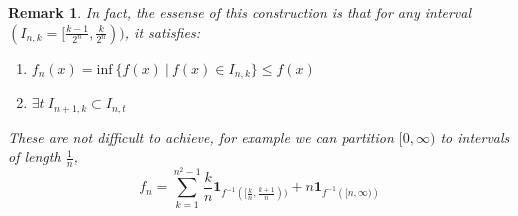 \documentclass[UTF8, 12pt]{article}
\newtheorem*{remark*}{Remark}
\begin{document}
    \begin{remark*}
        In fact, the essense of this construction is that for any interval $(I_{n,k} = [\frac{k-1}{2^n}, \frac{k}{2^n}))$, it satisfies:
        \begin{enumerate}
            \item  
                $
                f_n(x) = \text{inf}\ \{f(x)\ |\ f(x) \in I_{n,k}\} \leq f(x)
                $
            \item $\exists t\ I_{n+1,k} \subset I_{n,t}$
        \end{enumerate}
        These are not difficult to achieve, for example we can partition $[0,\infty)$ to intervals of length $\frac{1}{n}$, 
        $$
            f_n = \sum_{k=1}^{n^2-1} \frac{k}{n}\textbf{1}_{f^{-1}([\frac{k}{n}, \frac{k + 1}{n}))} + n\textbf{1}_{f^{-1}({[n,\infty)})}
        $$
    \end{remark*}
\end{document}
